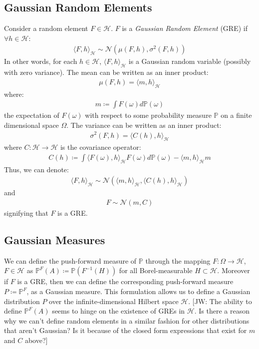 \documentclass[twoside,11pt]{article}
\newcommand{\jw}[1]{{\color{gray} [JW: #1]}}
\begin{document}
\subsection{Gaussian Random Elements}
 Consider a random element $F \in \mathcal{H}$. $F$ is a \textit{Gaussian Random Element} (GRE) if $\forall h \in \mathcal{H}$:
\begin{align}
    \langle F, h \rangle_\mathcal{H} \sim \mathcal{N}(\mu(F, h), \sigma^2(F, h))
\end{align}
In other words, for each $h \in \mathcal{H}$, $\langle F, h \rangle_\mathcal{H}$ is a Gaussian random variable (possibly with zero variance). The mean can be written as an inner product:
\begin{align}
\mu(F, h) = \langle m, h\rangle_{\mathcal{H}}
\end{align}
where:
\begin{align}
    m \coloneqq \int F(\omega) d \mathbb{P}(\omega)
\end{align}
the expectation of $F(\omega)$ with respect to some probability measure $\mathbb{P}$ on a finite dimensional space $\Omega$. The variance can be written as an inner product:
\begin{align}
\sigma^2(F, h) = \langle C(h), h\rangle_{\mathcal{H}}
\end{align}
where $C: \mathcal{H} \rightarrow \mathcal{H}$ is the covariance operator:
\begin{align}
    C(h) \coloneqq \int \langle F(\omega), h\rangle_{\mathcal{H}} F(\omega)d \mathbb{P}(\omega) - \langle m, h\rangle_{\mathcal{H}} m 
\end{align}
Thus, we can denote:
\begin{align}
    \langle F, h\rangle_{\mathcal{H}} \sim \mathcal{N}\left(  \langle m, h\rangle_{\mathcal{H}},  \langle C(h), h\rangle_{\mathcal{H}}\right)
\end{align}
and
\begin{align}
    F \sim \mathcal{N}(m, C)
\end{align}
signifying that $F$ is a GRE.
\subsection{Gaussian Measures \cite{wild2022generalized}}
We can define the push-forward measure of $\mathbb{P}$ through the mapping $F: \Omega \rightarrow \mathcal{H}$, $F \in \mathcal{H}$ as $\mathbb{P}^{F}(A) \coloneqq \mathbb{P}(F^{-1}(H))$ for all Borel-measurable $H \subset \mathcal{H}$. Moreover if $F$ is a GRE, then we can define the corresponding push-forward measure $P \coloneqq \mathbb{P}^{F}$, as a Gaussian measure. This formulation allows us to define a Gaussian distribution $P$ over the infinite-dimensional Hilbert space $\mathcal{H}$. \jw{The ability to define $\mathbb{P}^{F}(A)$ seems to hinge on the existence of GREs in $\mathcal{H}$. Is there a reason why we can't define random elements in a similar fashion for other distributions that aren't Gaussian? Is it because of the closed form expressions that exist for $m$ and $C$ above?}
\end{document}
